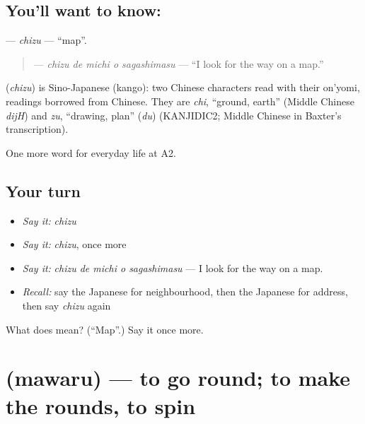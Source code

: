 \subsection*{You'll want to know: }
\textbf{} — \emph{chizu} — \textquotedblleft{}map\textquotedblright{}.

\begin{quote}
\textbf{  } — \emph{chizu de michi o sagashimasu} — \textquotedblleft{}I look for the way on a map.\textquotedblright{}
\end{quote}

\begin{cousinweb}
\textbf{} (\emph{chizu}) is Sino-Japanese (kango): two Chinese characters read with their on'yomi, readings borrowed from Chinese. They are \emph{chi}, \textquotedblleft{}ground, earth\textquotedblright{} (Middle Chinese \emph{dijH}) and \emph{zu}, \textquotedblleft{}drawing, plan\textquotedblright{} (\emph{du}) (KANJIDIC2; Middle Chinese in Baxter's transcription).
\end{cousinweb}

\begin{grammarlens}[title={What you've built}]
One more word for everyday life at A2.
\end{grammarlens}

\subsection*{Your turn}
\begin{itemize}
\raggedright
  \item \emph{Say it:} \emph{chizu}
  \item \emph{Say it:} \emph{chizu}, once more
  \item \emph{Say it:} \emph{chizu de michi o sagashimasu} — I look for the way on a map.
  \item \emph{Recall:} say the Japanese for neighbourhood, then the Japanese for address, then say \emph{chizu} again
\end{itemize}

\begin{tcolorbox}[breakable,colback=teal!4,colframe=teal!35!black,title={Before you move on}]
What does  mean? (\textquotedblleft{}Map\textquotedblright{}.) Say it once more.
\end{tcolorbox}
\section[\texorpdfstring{\ja{まわる} (mawaru)}{まわる (mawaru)}]{ (mawaru) — to go round; to make the rounds, to spin}

